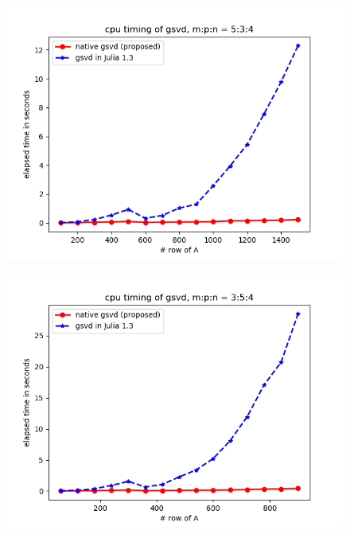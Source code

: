         \begin{figure}[H]
            \centering
            \begin{minipage}{.65\textwidth}
              \centering
              \includegraphics[width=\linewidth]{fig/m p n 5 3 4.png}
            \end{minipage}
            \label{cur_new_1}
        \end{figure}
    
        \begin{figure}[H]
            \centering
            \begin{minipage}{.65\textwidth}
              \centering
              \includegraphics[width=\linewidth]{fig/m p n 3 5 4.png}
            \end{minipage}%
            
        \end{figure}
        
